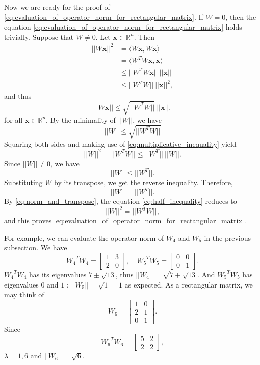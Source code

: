 \documentclass[12pt]{report}
\numberwithin{figure}{chapter}
\theoremstyle{plain}
\theoremstyle{definition}
\theoremstyle{corollary}
\theoremstyle{definition}
\theoremstyle{plain}
\theoremstyle{definition}
\theoremstyle{plain}
\newcommand\bx{\ensuremath{\boldsymbol x}}
\begin{document}
Now we are ready for the proof of \eqref{eq:evaluation_of_operator_norm_for_rectangular_matrix}.
If \(W=0\), then the equation \eqref{eq:evaluation_of_operator_norm_for_rectangular_matrix} holds trivially.
Suppose that \(W\neq0\).
Let \(\bx\in\mathbb R^n\).
Then
\begin{align*}
||W\bx||^2
&=\langle W\bx,W\bx\rangle\\
&=\langle W^TW\bx,\bx\rangle\\
&\le||W^TW\bx||\:||\bx||\\
&\le||W^TW||\:||\bx||^2,
\end{align*}
and thus
\[||W\bx||\le\sqrt{||W^TW||}\:||\bx||.\]
for all \(\bx\in\mathbb R^n\).
By the minimality of \(||W||\), we have
\[||W||\le\sqrt{||W^TW||}\]
Squaring both sides and making use of \eqref{eq:multiplicative_inequality} yield
\begin{equation}\label{eq:half_inequality}
||W||^2=||W^TW||\le||W^T||\:||W||.
\end{equation}
Since \(||W||\neq0\), we have
\[||W||\le||W^T||.\]
Substituting \(W\) by its transpose, we get the reverse inequality.
Therefore,
\begin{equation}\label{eq:norm_and_transpose}
||W||=||W^T||.
\end{equation}
By \eqref{eq:norm_and_transpose}, the equation \eqref{eq:half_inequality} reduces to
\[||W||^2=||W^TW||,\]
and this proves \eqref{eq:evaluation_of_operator_norm_for_rectangular_matrix}.

For example, we can evaluate the operator norm of \(W_4\) and \(W_5\) in the previous subsection.
We have
\[{W_4}^TW_4=\begin{bmatrix}1&3\\2&0\end{bmatrix},\quad{W_5}^TW_5=\begin{bmatrix}0&0\\0&1\end{bmatrix}.\]
\({W_4}^TW_4\) has its eigenvalues \(7\pm\sqrt{13}\), thus \(||W_4||=\sqrt{7+\sqrt{13}}\).
And \({W_5}^TW_5\) has eigenvalues \(0\) and \(1\) ; \(||W_5||=\sqrt1=1\) as expected.
As a rectangular matrix, we may think of
\[W_6=\begin{bmatrix}1&0\\2&1\\0&1\end{bmatrix}.\]
Since
\[{W_6}^TW_6=\begin{bmatrix}5&2\\2&2\end{bmatrix},\]
\(\lambda=1,6\) and \(||W_6||=\sqrt6\).
\end{document}
